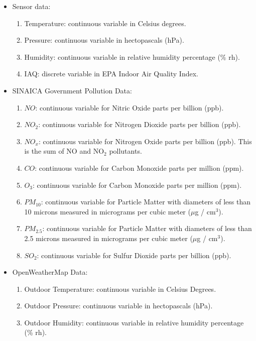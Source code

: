 \documentclass{llncs}
\begin{document}
\begin{itemize}
\item
  Sensor data:

  \begin{enumerate}
  \def\labelenumi{\arabic{enumi}.}
  \item
    Temperature: continuous variable in Celsius degrees.
  \item
    Pressure: continuous variable in hectopascals (hPa).
  \item
    Humidity: continuous variable in relative humidity percentage (\%
    rh).
  \item
    IAQ: discrete variable in EPA Indoor Air Quality Index.
  \end{enumerate}
\item
  SINAICA Government Pollution Data:

  \begin{enumerate}
  \def\labelenumi{\arabic{enumi}.}
  \item
    $NO$: continuous variable for Nitric Oxide parts per billion (ppb).
  \item
    $NO_2$: continuous variable for Nitrogen Dioxide parts per billion
    (ppb).
  \item
    $NO_x$: continuous variable for Nitrogen Oxide parts per billion
    (ppb). This is the sum of NO and NO\(_2\) pollutants.
  \item
    $CO$: continuous variable for Carbon Monoxide parts per million (ppm).
  \item
    $O_3$: continuous variable for Carbon Monoxide parts per million
    (ppm).
  \item
    $PM_{10}$: continuous variable for Particle Matter with diameters of less
    than 10 microns measured in micrograms per cubic meter (\(\mu\)g /
    cm\(^3\)).
  \item
    $PM_{2.5}$: continuous variable for Particle Matter with diameters of
    less than 2.5 microns measured in micrograms per cubic meter
    (\(\mu\)g / cm\(^3\)).
  \item
    $SO_2$: continuous variable for Sulfur Dioxide parts per billion
    (ppb).
  \end{enumerate}
\item
  OpenWeatherMap Data:

  \begin{enumerate}
  \def\labelenumi{\arabic{enumi}.}
  \item
    Outdoor Temperature: continuous variable in Celsius Degrees.
  \item
    Outdoor Pressure: continuous variable in hectopascals (hPa).
  \item
    Outdoor Humidity: continuous variable in relative humidity percentage
    (\% rh).
  \end{enumerate}
\end{itemize}
\end{document}
